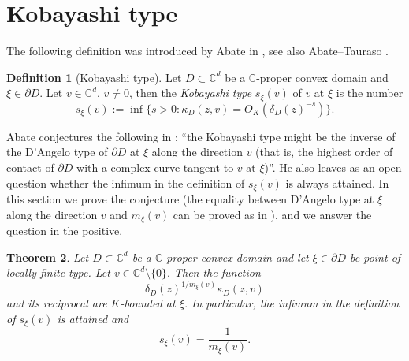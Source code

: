 \documentclass[11pt, reqno]{amsart}
\numberwithin{equation}{section}
\newtheorem{theorem}{Theorem}[section]
\theoremstyle{definition}
\newtheorem{definition}[theorem]{Definition}
\newcommand{\C}{\mathbb{C}}
\begin{document}
{{		\section{Kobayashi type}
		
		
		
		The following definition was introduced by Abate in \cite{Absurv}, see also Abate--Tauraso \cite{AbTau}.
		
		\begin{definition}[Kobayashi type]\label{KRtype}
			Let $D\subset\C^d$ be a $\C$-proper convex domain and $\xi\in\partial D$. Let $v\in\C^d$, $v\neq 0$, then the {\sl Kobayashi type} $s_\xi(v)$ of $v$ at $\xi$ is the number
			$$s_\xi(v):=\inf\{s>0:\kappa_D(z,v)=O_K(\delta_D(z)^{-s})\}.$$
		\end{definition}
		
		Abate  conjectures the following  in \cite{Absurv}: ``the Kobayashi type might be the inverse of the D'Angelo type of $\partial D$ at $\xi$ along the direction $v$ (that is, the highest order of contact of $\partial D$ with a complex curve tangent to $v$ at $\xi$)''. He also leaves as an open question whether the infimum  in the definition of $s_\xi(v)$ is always attained.
		In this section we prove the conjecture (the equality between D'Angelo type at $\xi$ along the direction $v$ and $m_\xi(v)$ can be proved as in \cite{BS}), and we answer the question in the positive.
		
		
			{\begin{theorem}\label{KtypeLtype}
			Let $D\subset\C^d$ be a $\C$-proper convex domain and let $\xi\in\partial D$ be point of locally finite type.  Let $v\in\C^d\setminus\{0\}.$ Then the function $$\delta_D(z)^{1/m_\xi(v)}\kappa_D(z,v)$$
			and its reciprocal are $K$-bounded at $\xi$.
In particular, the infimum in the definition of $s_\xi(v)$ is attained and
$$s_\xi(v)=\frac{1}{m_\xi(v)}.$$
	\end{theorem}
		
}}}
\end{document}
